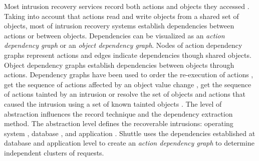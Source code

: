 Most intrusion recovery services record both actions and objects they accessed \cite{goel,itdb,warp}. Taking into account that actions read and write objects from a shared set of objects, most of intrusion recovery systems establish dependencies between actions or between objects. 
Dependencies can be visualized as an \textit{action dependency graph} or an \textit{object dependency graph}. Nodes of action dependency graphs represent actions and edges indicate dependencies though shared objects. Object dependency graphs establish dependencies between objects through actions. Dependency graphs have been used to order the re-execution of actions \cite{undoForOperators}, get the sequence of actions affected by an object value change \cite{warp}, get the sequence of actions tainted by an intrusion \cite{goel} or resolve the set of objects and actions that caused the intrusion using a set of known tainted objects \cite{backtracker}. The level of abstraction influences the record technique and the dependency extraction method. The abstraction level defines the recoverable intrusions: operating system \cite{taser,retro}, database \cite{itdb,phoenix}, and application \cite{goel,warp,aire}. Shuttle uses the dependencies established at database and application level to create an \emph{action dependency graph} to determine independent clusters of requests.